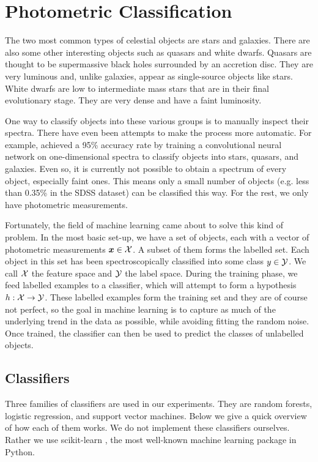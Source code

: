 

\chapter{Photometric Classification}
\label{cha:ml}

The two most common types of celestial objects are stars and galaxies. There are also some other
interesting objects such as quasars and white dwarfs. Quasars are thought to be supermassive black
holes surrounded by an accretion disc. They are very luminous and, unlike galaxies, appear as
single-source objects like stars. White dwarfs are low to intermediate mass stars that are in their
final evolutionary stage. They are very dense and have a faint luminosity.

One way to classify objects into these various groups is to manually inspect their spectra. There
have even been attempts to make the process more automatic. For example,  achieved a
95\% accuracy rate by training a convolutional neural network on one-dimensional spectra to classify
objects into stars, quasars, and galaxies. Even so, it is currently not possible to obtain a
spectrum of every object, especially faint ones. This means only a small number of objects (e.g.
less than 0.35\% in the SDSS dataset) can be classified this way. For the rest, we only have
photometric measurements.

Fortunately, the field of machine learning came about to solve this kind of problem. In the most
basic set-up, we have a set of objects, each with a vector of photometric measurements $\bm{x} \in
\mathcal{X}$. A subset of them forms the labelled set. Each object in this set has been spectroscopically
classified into some class $y \in \mathcal{Y}$. We call $\mathcal{X}$ the feature space and $\mathcal{Y}$ the label space.
During the training phase, we feed labelled examples to a classifier, which will attempt to form a
hypothesis $h: \mathcal{X} \rightarrow \mathcal{Y}$. These labelled examples form the training set and they are of
course not perfect, so the goal in machine learning is to capture as much of the underlying trend in
the data as possible, while avoiding fitting the random noise. Once trained, the classifier can then
be used to predict the classes of unlabelled objects.

\section{Classifiers}

\label{sec:machine} Three families of classifiers are used in our experiments. They are random
forests, logistic regression, and support vector machines. Below we give a quick overview of how
each of them works. We do not implement these classifiers ourselves. Rather we use scikit-learn
\cite{pedregosa11}, the most well-known machine learning package in Python.

